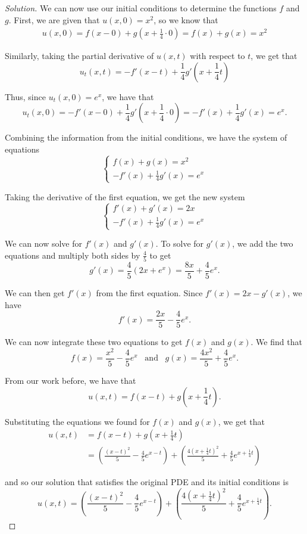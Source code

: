\documentclass[11pt]{article}
\newenvironment{solution}
  {\renewcommand\qedsymbol{$\blacksquare$}\begin{proof}[Solution]}
  {\end{proof}}
\begin{document}
\begin{enumerate}[a)]
\begin{solution}
We can now use our initial conditions to determine the functions $f$ and $g$. First, we are given that $u(x, 0) = x^2$, so we know that
\begin{align*}
	u(x, 0) = f(x-0) + g\left(x + \frac{1}{4}\cdot 0 \right) = f(x) + g(x) = x^2
\end{align*}

Similarly, taking the partial derivative of $u(x, t)$ with respect to $t$, we get that
\[ u_t(x, t) = -f'(x-t) + \frac{1}{4}g'\left(x+\frac{1}{4}t \right)\]

Thus, since $u_t(x, 0) = e^x$, we have that
\[ u_t(x, 0) = -f'(x-0) + \frac{1}{4}g'\left(x+\frac{1}{4}\cdot0 \right) = -f'(x) + \frac{1}{4}g'(x) = e^x.\]

Combining the information from the initial conditions, we have the system of equations
\[\begin{cases}
f(x) + g(x) = x^2 \\
-f'(x) + \frac{1}{4}g'(x) = e^x
\end{cases}\]

Taking the derivative of the first equation, we get the new system
\[\begin{cases}
	f'(x) + g'(x) = 2x \\
	-f'(x) + \frac{1}{4}g'(x) = e^x
\end{cases}\]

We can now solve for $f'(x)$ and $g'(x)$. To solve for $g'(x)$, we add the two equations and multiply both sides by $\frac{4}{5}$ to get 
\[g'(x) = \frac{4}{5} \left(2x+e^x\right) = \frac{8x}{5} + \frac{4}{5}e^x.\]

We can then get $f'(x)$ from the first equation. Since $f'(x) = 2x - g'(x)$, we have \[f'(x) = \frac{2x}{5} - \frac{4}{5}e^x.\]

We can now integrate these two equations to get $f(x)$ and $g(x)$. We find that
\[f(x) = \frac{x^2}{5} -\frac{4}{5}e^x \, \, \, \text { and } \, \, \, g(x) = \frac{4x^2}{5} + \frac{4}{5}e^x. \]

From our work before, we have that
\[ u(x, t) = f(x-t) + g\left( x + \frac{1}{4}t \right).\]

Substituting the equations we found for $f(x)$ and $g(x)$, we get that
\begin{align*}u(x, t) &= f(x-t) + g\left( x + \frac{1}{4}t \right) \\
	&= \left(\frac{(x-t)^2}{5} -\frac{4}{5}e^{x-t} \right) + \left(\frac{4(x+\frac{1}{4}t)^2}{5}+ \frac{4}{5}e^{x+\frac{1}{4}t}\right)
\end{align*}

and so our solution that satisfies the original PDE and its initial conditions is 
\[ \boxed{u(x, t) = \left(\frac{(x-t)^2}{5} -\frac{4}{5}e^{x-t} \right) + \left(\frac{4(x+\frac{1}{4}t)^2}{5}+ \frac{4}{5}e^{x+\frac{1}{4}t}\right) }.\]
\end{solution} 
\end{enumerate}
\end{document}
